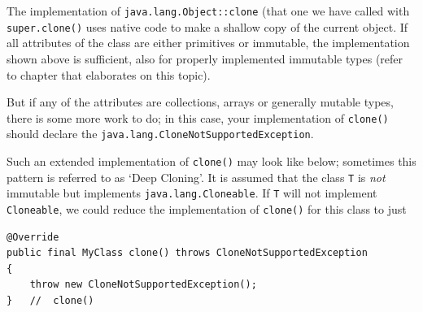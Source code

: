 The implementation of \lstinline|java.lang.Object::clone| (that one we have called with \lstinline|super.clone()| uses native code to make a shallow copy of the current object. If all attributes of the class are either primitives or immutable, the implementation shown above is sufficient, also for properly implemented immutable types (refer to chapter  that elaborates on this topic).

But if any of the attributes are collections, arrays or generally mutable types, there is some more work to do; in this case, your implementation of \lstinline|clone()| should declare the \lstinline|java.lang.CloneNotSupportedException|.

Such an extended implementation of \lstinline|clone()| may look like below; sometimes this pattern is referred to as ‘Deep Cloning’. It is assumed that the class \lstinline|T| is \textit{not} immutable but implements \lstinline|java.lang.Cloneable|. If \lstinline|T| will not implement \lstinline|Cloneable|, we could reduce the implementation of \lstinline|clone()| for this class to just
\begin{lstlisting}
@Override
public final MyClass clone() throws CloneNotSupportedException
{
    throw new CloneNotSupportedException();
}   //  clone()
\end{lstlisting}

